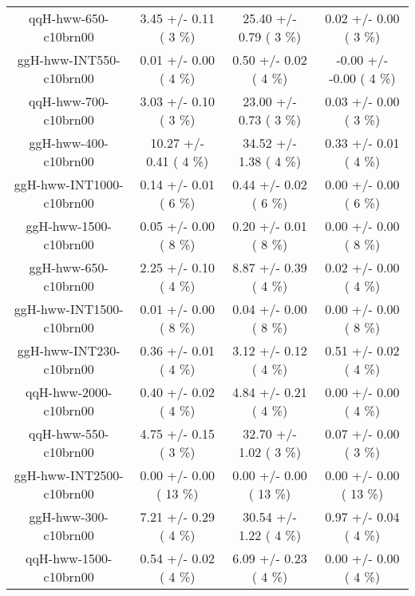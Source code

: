 \begin{table}[h!]
\begin{center}
{\begin{tabular}{
c| c | c | c | }
 qqH-hww-650-c10brn00   &       3.45 +/-       0.11 (         3 \%)   &      25.40 +/-       0.79 (         3 \%)   &       0.02 +/-       0.00 (         3 \%)  \\
 ggH-hww-INT550-c10brn00   &       0.01 +/-       0.00 (         4 \%)   &       0.50 +/-       0.02 (         4 \%)   &      -0.00 +/-      -0.00 (         4 \%)  \\
 qqH-hww-700-c10brn00   &       3.03 +/-       0.10 (         3 \%)   &      23.00 +/-       0.73 (         3 \%)   &       0.03 +/-       0.00 (         3 \%)  \\
 ggH-hww-400-c10brn00   &      10.27 +/-       0.41 (         4 \%)   &      34.52 +/-       1.38 (         4 \%)   &       0.33 +/-       0.01 (         4 \%)  \\
 ggH-hww-INT1000-c10brn00   &       0.14 +/-       0.01 (         6 \%)   &       0.44 +/-       0.02 (         6 \%)   &       0.00 +/-       0.00 (         6 \%)  \\
 ggH-hww-1500-c10brn00   &       0.05 +/-       0.00 (         8 \%)   &       0.20 +/-       0.01 (         8 \%)   &       0.00 +/-       0.00 (         8 \%)  \\
 ggH-hww-650-c10brn00   &       2.25 +/-       0.10 (         4 \%)   &       8.87 +/-       0.39 (         4 \%)   &       0.02 +/-       0.00 (         4 \%)  \\
 ggH-hww-INT1500-c10brn00   &       0.01 +/-       0.00 (         8 \%)   &       0.04 +/-       0.00 (         8 \%)   &       0.00 +/-       0.00 (         8 \%)  \\
 ggH-hww-INT230-c10brn00   &       0.36 +/-       0.01 (         4 \%)   &       3.12 +/-       0.12 (         4 \%)   &       0.51 +/-       0.02 (         4 \%)  \\
 qqH-hww-2000-c10brn00   &       0.40 +/-       0.02 (         4 \%)   &       4.84 +/-       0.21 (         4 \%)   &       0.00 +/-       0.00 (         4 \%)  \\
 qqH-hww-550-c10brn00   &       4.75 +/-       0.15 (         3 \%)   &      32.70 +/-       1.02 (         3 \%)   &       0.07 +/-       0.00 (         3 \%)  \\
 ggH-hww-INT2500-c10brn00   &       0.00 +/-       0.00 (        13 \%)   &       0.00 +/-       0.00 (        13 \%)   &       0.00 +/-       0.00 (        13 \%)  \\
 ggH-hww-300-c10brn00   &       7.21 +/-       0.29 (         4 \%)   &      30.54 +/-       1.22 (         4 \%)   &       0.97 +/-       0.04 (         4 \%)  \\
 qqH-hww-1500-c10brn00   &       0.54 +/-       0.02 (         4 \%)   &       6.09 +/-       0.23 (         4 \%)   &       0.00 +/-       0.00 (         4 \%)  \\
\hline

\end{tabular}
}
\end{center}
\end{table}

